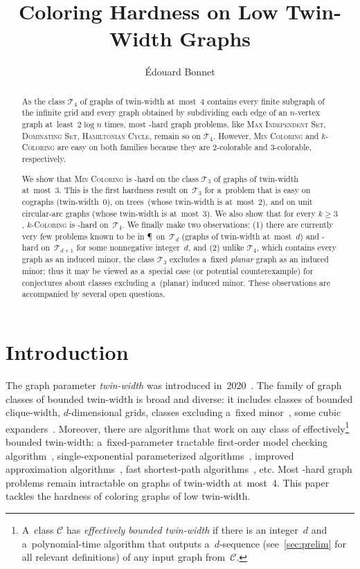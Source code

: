 \documentclass[a4paper,USenglish,cleveref,hyperref,autoref]{lipics-v2021}
\title{Coloring Hardness on Low Twin-Width Graphs}
\author{\'{E}douard Bonnet}{Univ Lyon, CNRS, ENS de Lyon, Université Claude Bernard Lyon 1, LIP UMR5668, France \and \url{http://perso.ens-lyon.fr/edouard.bonnet/}}{edouard.bonnet@ens-lyon.fr}{https://orcid.org/0000-0002-1653-5822}{}
\newcommand{\mis}{\textsc{Max Independent Set}\xspace}
\newcommand{\kcol}{\textsc{$k$-Coloring}\xspace}
\newcommand{\hamc}{\textsc{Hamiltonian Cycle}\xspace}
\newcommand{\mds}{\textsc{Dominating Set}\xspace}
\newcommand{\chr}{\textsc{Min Coloring}\xspace}
\begin{document}
\maketitle

\begin{abstract} 
  As the class $\mathcal T_4$ of graphs of twin-width at~most~4 contains every finite subgraph of the infinite grid and every graph obtained by subdividing each edge of an $n$-vertex graph at~least~$2 \log n$ times, most \NP-hard graph problems, like \mis, \mds, \hamc, remain so on $\mathcal T_4$.
  However, \chr and \kcol are easy on both families because they are 2-colorable and 3-colorable, respectively.

  We show that \chr is \NP-hard on the class $\mathcal T_3$ of graphs of twin-width at~most~3.
  This is the first hardness result on~$\mathcal T_3$ for a~problem that is easy on cographs (twin-width~0), on trees~(whose twin-width is at~most~2), and on unit circular-arc graphs (whose twin-width is at~most~3).
  We also show that for every $k \geqslant 3$, \kcol is \NP-hard on~$\mathcal T_4$.
  We finally make two observations: (1) there are currently very few problems known to be in \P\ on~$\mathcal T_d$ (graphs of twin-width at~most~$d$) and \NP-hard on~$\mathcal T_{d+1}$ for some nonnegative integer~$d$, and (2) unlike $\mathcal T_4$, which contains every graph as an induced minor, the class $\mathcal T_3$ excludes a~fixed \emph{planar} graph as an induced minor; thus it may be viewed as a~special case (or potential counterexample) for conjectures about classes excluding a~(planar) induced minor.
  These observations are accompanied by several open questions.
\end{abstract}

\section{Introduction}\label{sec:intro}

The graph parameter \emph{twin-width} was introduced in~2020~\cite{twin-width1}.
The family of graph classes of bounded twin-width is broad and diverse: it includes classes of bounded clique-width, $d$-dimensional grids, classes excluding a~fixed minor~\cite{twin-width1}, some cubic expanders~\cite{twin-width2}.
Moreover, there are algorithms that work on any class of effectively\footnote{A~class $\mathcal C$ has \emph{effectively bounded twin-width} if there is an integer~$d$ and a~polynomial-time algorithm that outputs a~$d$-sequence (see~\cref{sec:prelim} for all relevant definitions) of any input graph from~$\mathcal C$.} bounded twin-width: a~fixed-parameter tractable first-order model checking algorithm~\cite{twin-width1}, single-exponential parameterized algorithms~\cite{twin-width3}, improved approximation algorithms~\cite{twin-width3,BergeBDW23}, fast shortest-path algorithms~\cite{twin-width3,Bannach24}, etc.
Most \NP-hard graph problems remain intractable on graphs of twin-width at~most~4.
This paper tackles the hardness of coloring graphs of low twin-width.
\end{document}
